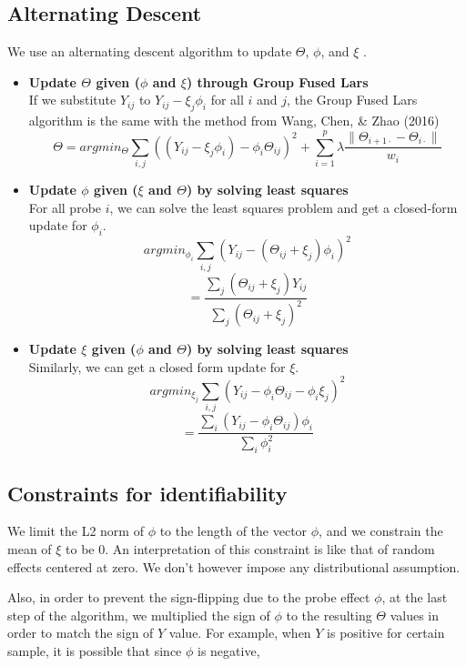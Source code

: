 \documentclass[11pt]{article}
\begin{document}
\subsection{Alternating Descent}
We use an alternating descent algorithm to update $\Theta$, $\phi$, and $\xi$ \cite{wang2016estimating}. 
\begin{itemize}
\item
\textbf{Update $\Theta$ given ($\phi$ and $\xi$) through Group Fused Lars \cite{bleakley2011group}}\\
If we substitute $Y_{ij}$ to $Y_{ij} - \xi_j \phi_i$ for all $i$ and $j$, the Group Fused Lars algorithm is the same with the method from Wang, Chen, \& Zhao (2016) \cite{wang2016estimating}
$$\Theta = argmin_{\Theta} \sum_{i,j} ((Y_{ij} - \xi_j \phi_i) - \phi_i \Theta_{ij})^2 + \sum_{i=1}^{p} \lambda \frac{\|\Theta_{i+1\cdot} - \Theta_{i\cdot}  \|}{w_i} $$

\item
\textbf{Update $\phi$  given ($\xi$ and $\Theta$) by solving least squares}\\
For all probe $i$, we can solve the least squares problem and get a closed-form update for $\phi_i$. 
$$argmin_{\phi_i} \sum_{i,j}(Y_{ij} - (\Theta_{ij}+\xi_j)\phi_i)^2$$
$$ =  \frac{\sum_j (\Theta_{ij} + \xi_j)Y_{ij}}{
\sum_j (\Theta_{ij}+\xi_j)^2
}$$
\item
\textbf{Update $\xi$ given ($\phi$ and $\Theta$) by solving least squares}\\
Similarly, we can get a closed form update for $\xi$.
$$argmin_{\xi_j} \sum_{i,j} (Y_{ij} - \phi_i \Theta_{ij} - \phi_i \xi_j)^2$$
$$= \frac{
\sum_i (Y_{ij}-\phi_i \Theta_{ij})\phi_i
}{
\sum_i \phi_i^2
}$$
\end{itemize}

\subsection{Constraints for identifiability}
\noindent We limit the L2 norm of $\phi$ to the length of the vector $\phi$, and we constrain the mean of $\xi$ to be 0. An interpretation of this constraint is like that of random effects centered at zero. We don't however impose any distributional assumption.

\noindent Also, in order to prevent the sign-flipping due to the probe effect $\phi$, at the last step of the algorithm, we multiplied the sign of $\phi$ to the resulting $\Theta$ values in order to match the sign of $Y$ value. For example, when $Y$ is positive for certain sample, it is possible that since $\phi$ is negative, 
\end{document}
